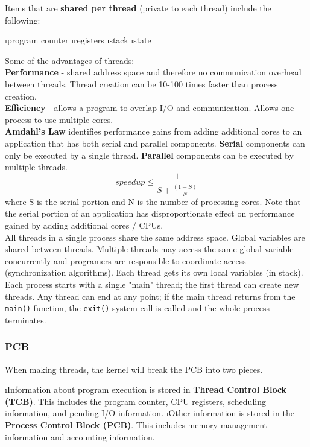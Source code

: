 \documentclass{article}
\begin{document}
    \noindent Items that are \textbf{shared per thread} (private to each thread) include the following:

    \bl
    \i program counter
    \i registers 
    \i stack
    \i state
    \el
    
    \noindent Some of the advantages of threads:  \\
    \textbf{Performance} - shared address space and therefore no communication overhead between threads. Thread creation can be 10-100 times faster than process creation. \\
    \textbf{Efficiency} - allows a program to overlap I/O and communication. Allows one process to use multiple cores. \\

    \noindent \textbf{Amdahl's Law} identifies performance gains from adding additional cores to an application that has both serial and parallel components. \textbf{Serial} components can only be executed by a single thread. \textbf{Parallel} components can be executed by multiple threads. 
    $$speedup \leq \frac{1}{S + \frac{(1-S)}{N}}$$
    where S is the serial portion and N is the number of processing cores. Note that the serial portion of an application has disproportionate effect on performance gained by adding additional cores / CPUs. \\

    All threads in a single process share the same address space. Global variables are shared between threads. Multiple threads may access the same global variable concurrently and programers are responsible to coordinate access (synchronization algorithms). Each thread gets its own local variables (in stack). Each process starts with a single "main" thread; the first thread can create new threads. Any thread can end at any point; if the main thread returns from the \texttt{main()} function, the \texttt{exit()} system call is called and the whole process terminates. \\
    
    \subsubsection{PCB}

    When making threads, the kernel will break the PCB into two pieces.

    \begin{enumerate}
    \i Information about program execution is stored in \textbf{Thread Control Block (TCB)}. This includes the program counter, CPU registers, scheduling information, and pending I/O information. 
    \i Other information is stored in the \textbf{Process Control Block (PCB)}. This includes memory management information and accounting information. 
    \end{enumerate}
\end{document}
